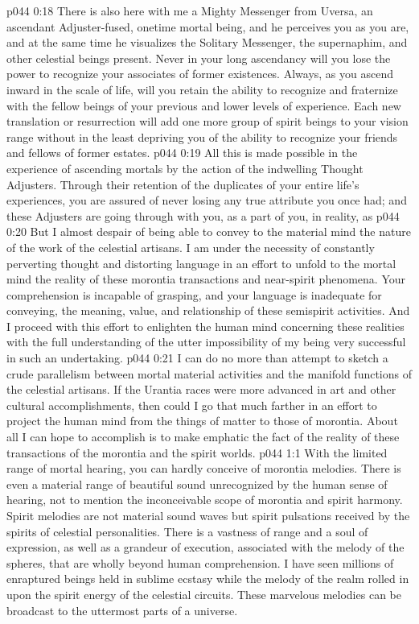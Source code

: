 \vs p044 0:18 There is also here with me a Mighty Messenger from Uversa, an ascendant Adjuster\hyp{}fused, onetime mortal being, and he perceives you as you are, and at the same time he visualizes the Solitary Messenger, the supernaphim, and other celestial beings present. Never in your long ascendancy will you lose the power to recognize your associates of former existences. Always, as you ascend inward in the scale of life, will you retain the ability to recognize and fraternize with the fellow beings of your previous and lower levels of experience. Each new translation or resurrection will add one more group of spirit beings to your vision range without in the least depriving you of the ability to recognize your friends and fellows of former estates.
\vs p044 0:19 All this is made possible in the experience of ascending mortals by the action of the indwelling Thought Adjusters. Through their retention of the duplicates of your entire life’s experiences, you are assured of never losing any true attribute you once had; and these Adjusters are going through with you, as a part of you, in reality, as 
\vs p044 0:20 But I almost despair of being able to convey to the material mind the nature of the work of the celestial artisans. I am under the necessity of constantly perverting thought and distorting language in an effort to unfold to the mortal mind the reality of these morontia transactions and near\hyp{}spirit phenomena. Your comprehension is incapable of grasping, and your language is inadequate for conveying, the meaning, value, and relationship of these semispirit activities. And I proceed with this effort to enlighten the human mind concerning these realities with the full understanding of the utter impossibility of my being very successful in such an undertaking.
\pc \vs p044 0:21 I can do no more than attempt to sketch a crude parallelism between mortal material activities and the manifold functions of the celestial artisans. If the Urantia races were more advanced in art and other cultural accomplishments, then could I go that much farther in an effort to project the human mind from the things of matter to those of morontia. About all I can hope to accomplish is to make emphatic the fact of the reality of these transactions of the morontia and the spirit worlds.
\vs p044 1:1 With the limited range of mortal hearing, you can hardly conceive of morontia melodies. There is even a material range of beautiful sound unrecognized by the human sense of hearing, not to mention the inconceivable scope of morontia and spirit harmony. Spirit melodies are not material sound waves but spirit pulsations received by the spirits of celestial personalities. There is a vastness of range and a soul of expression, as well as a grandeur of execution, associated with the melody of the spheres, that are wholly beyond human comprehension. I have seen millions of enraptured beings held in sublime ecstasy while the melody of the realm rolled in upon the spirit energy of the celestial circuits. These marvelous melodies can be broadcast to the uttermost parts of a universe.
